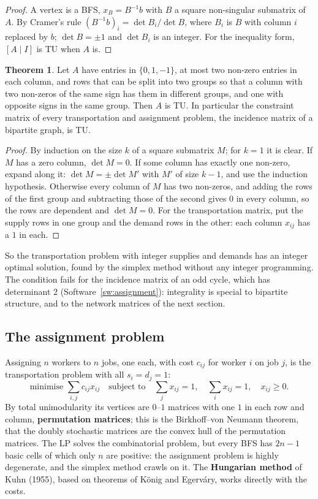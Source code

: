 \documentclass[11pt,a4paper]{article}
\numberwithin{equation}{section}
\theoremstyle{definition}
\newtheorem{thm}{Theorem}[subsection]
\begin{document}
\begin{proof}
A vertex is a BFS, $x_B = B^{-1}b$ with $B$ a square non-singular submatrix of $A$. By Cramer's rule $(B^{-1}b)_i = \det B_i/\det B$, where $B_i$ is $B$ with column $i$ replaced by $b$; $\det B = \pm1$ and $\det B_i$ is an integer. For the inequality form, $[A \mid I]$ is TU when $A$ is.
\end{proof}

\begin{thm}
\label{thm:bipartitetu}
Let $A$ have entries in $\{0, 1, -1\}$, at most two non-zero entries in each column, and rows that can be split into two groups so that a column with two non-zeros of the same sign has them in different groups, and one with opposite signs in the same group. Then $A$ is TU. In particular the constraint matrix of
every transportation and assignment problem, the incidence matrix of a bipartite graph, is TU.
\end{thm}

\begin{proof}
By induction on the size $k$ of a square submatrix $M$; for $k = 1$ it is clear. If $M$ has a zero column, $\det M = 0$. If some column has exactly one non-zero, expand along it: $\det M = \pm\det M'$ with $M'$ of size $k - 1$, and use the induction hypothesis. Otherwise every column of $M$ has two non-zeros, and adding
the rows of the first group and subtracting those of the second gives $0$ in every column, so the rows are dependent and $\det M = 0$. For the transportation matrix, put the supply rows in one group and the demand rows in the other: each column $x_{ij}$ has a $1$ in each.
\end{proof}

So the transportation problem with integer supplies and demands has an integer optimal solution, found by the simplex method without any integer programming. The condition fails for the incidence matrix of an odd cycle, which has determinant $2$ (Software~\ref{sw:assignment}): integrality is special to bipartite structure,
and to the network matrices of the next section.

\subsection{The assignment problem}
\label{ssec:assignment}

Assigning $n$ workers to $n$ jobs, one each, with cost $c_{ij}$ for worker $i$ on job $j$, is the transportation problem with all $s_i = d_j = 1$:
\[
\text{minimise } \sum_{i,j}c_{ij}x_{ij} \quad\text{subject to}\quad \sum_jx_{ij} = 1, \quad \sum_ix_{ij} = 1, \quad x_{ij} \geq 0 .
\]
By total unimodularity its vertices are $0$--$1$ matrices with one $1$ in each row and column, \textbf{permutation matrices}; this is the Birkhoff--von Neumann theorem, that the doubly stochastic matrices are the convex hull of the permutation matrices. The LP solves the combinatorial problem, but every BFS has $2n - 1$ basic
cells of which only $n$ are positive: the assignment problem is highly degenerate, and the simplex method crawls on it. The \textbf{Hungarian method} of Kuhn (1955), based on theorems of K\"onig and Egerv\'ary, works directly with the costs.
\end{document}
